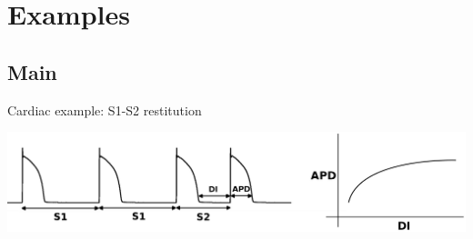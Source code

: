 \documentclass[t,xcolor={usenames,dvipsnames}]{beamer}
\begin{document}
\section{Examples}
\subsection*{Main}

\begin{frame}{Cardiac example: S1-S2 restitution}
\begin{center}
\includegraphics[width=\textwidth]{S1S2}
\end{center}
\end{frame}
\end{document}
